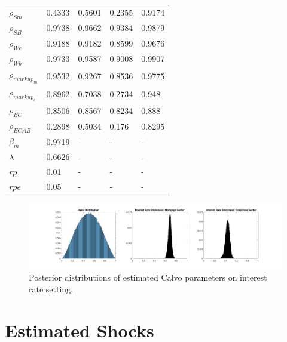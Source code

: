 \documentclass[12pt]{article}
\numberwithin{equation}{section}
\begin{document}
\begin{table}[H]
\begin{tabular}{l||llll}
$\rho_{Sm}$ & 0.4333 & 0.5601 & 0.2355 & 0.9174 \\
$\rho_{SB}$ & 0.9738 & 0.9662 & 0.9384 & 0.9879 \\
$\rho_{We}$ & 0.9188 & 0.9182 & 0.8599 & 0.9676 \\
$\rho_{Wb}$ & 0.9733 & 0.9587 & 0.9008 & 0.9907 \\
$\rho_{markup_m}$ & 0.9532 & 0.9267 & 0.8536 & 0.9775 \\
$\rho_{markup_e}$ & 0.8962 & 0.7038 & 0.2734 & 0.948 \\
$\rho_{EC}$ & 0.8506 & 0.8567 & 0.8234 & 0.888 \\
$\rho_{ECAB}$ & 0.2898 & 0.5034 & 0.176 & 0.8295\\
$\beta_m$ & 0.9719 & - & - & -\\
$\lambda$ & 0.6626 & - & - & -\\
$rp$ & 0.01 & - & - & -\\
$rpe$ & 0.05 & - & - & -\\
\end{tabular}
\end{table}


\begin{figure}[H]
\label{posterior_dist_calvo}
\caption{Posterior distributions of estimated Calvo parameters on interest rate setting.}
\includegraphics[scale=0.5]{posteriordistributions_calvo2.pdf}
\end{figure}


\section*{Estimated Shocks}
\end{document}
